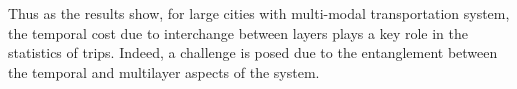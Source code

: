 Thus as the results show, for large cities with multi-modal transportation system, the temporal cost due to interchange between layers plays a key role in the statistics of trips. Indeed, a challenge is posed due to the entanglement between  the temporal and multilayer aspects of the system. 


